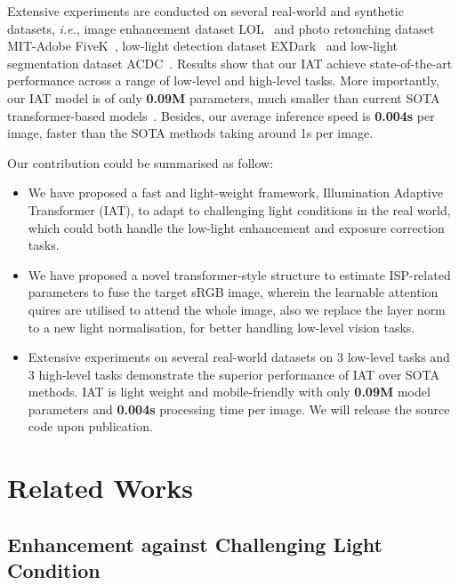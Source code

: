 \documentclass{bmvc2k}
\begin{document}
Extensive experiments are conducted on several real-world and synthetic datasets, \textit{i.e.}, image enhancement dataset LOL~\cite{LOL_dataset} and photo retouching dataset MIT-Adobe FiveK~\cite{fivek_dataset}, low-light detection dataset EXDark~\cite{EXDark} and low-light segmentation dataset ACDC~\cite{ACDC}. Results show that our IAT achieve state-of-the-art performance across a range of low-level and high-level tasks. More importantly, our IAT model is of only \textbf{0.09M} parameters, much smaller than current SOTA transformer-based models~\cite{IPT_CVPR,Wang2022Uformer,MLP_enhancement}. Besides, our average inference speed is \textbf{0.004s} per image, faster than the SOTA methods taking around 1s per image.

Our contribution could be summarised as follow:
\vspace{-2mm}
\begin{itemize}
    \item We have proposed a fast and light-weight framework, Illumination Adaptive Transformer (IAT), to adapt to challenging light conditions in the real world, which could both handle the low-light enhancement and exposure correction tasks.
    \vspace{-1mm}
    \item We have proposed a novel transformer-style structure to estimate ISP-related parameters to fuse the target sRGB image, wherein the learnable attention quires are utilised to attend the whole image, also we replace the layer norm to a new light normalisation, for better handling low-level vision tasks.
    \vspace{-1mm}
    \item Extensive experiments on several real-world datasets on 3 low-level tasks and 3 high-level tasks demonstrate the superior performance of IAT over SOTA methods. IAT is light weight and  mobile-friendly with only \textbf{0.09M} model parameters and \textbf{0.004s} processing time per image. We will release the source code upon publication.
\end{itemize}
\vspace{-2mm}


\section{Related Works}

\label{sec:related_works}
\subsection{Enhancement against Challenging Light Condition}
\end{document}
